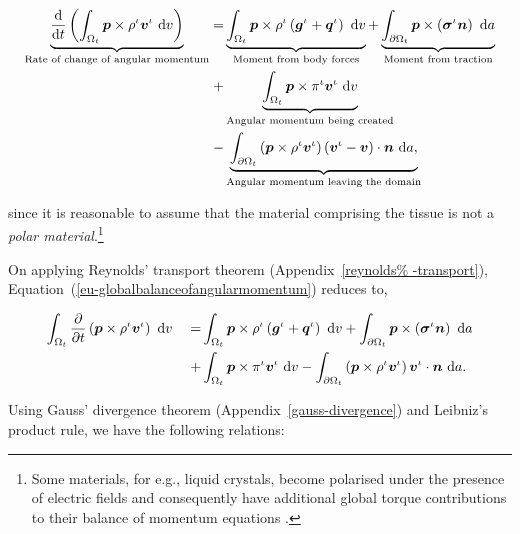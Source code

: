 \begin{equation}
\begin{split}
\underbrace{\frac{\mathrm{d}}{\mathrm{d}t}\left(\int_{\Omega_{t}} \mbox{\boldmath$ p$}
  \times \rho^{\iota} \mbox{\boldmath$ v$}^{\iota}\ \mathrm{d}v\right)}_{\text{Rate of
    change of angular momentum}} = & \underbrace{\int_{\Omega_{t}} \mbox{\boldmath$ p$}
  \times \rho^{\iota} \left(\mbox{\boldmath$ g$}^{\iota} +
  \mbox{\boldmath$ q$}^{\iota}\right)\ \mathrm{d}v}_{\text{Moment from body forces}} +
\underbrace{\int_{\partial \Omega_{t}} \mbox{\boldmath$ p$} \times
  \left(\mbox{\boldmath$\sigma$}^{\iota}\mbox{\boldmath$ n$}\right)\ \mathrm{d}a}_{\text{Moment from
    traction}}\\ + & \underbrace{\int_{\Omega_{t}} \mbox{\boldmath$ p$} \times
  \pi^{\iota}\mbox{\boldmath$ v$}^{\iota}\ \mathrm{d}v}_{\text{Angular momentum being
    created}} \\ - & \underbrace{\int_{\partial \Omega_{t}} \left(\mbox{\boldmath$ p$}
  \times \rho^{\iota} \mbox{\boldmath$ v$}^{\iota}\right) \left(\mbox{\boldmath$ v$}^{\iota} -
  \mbox{\boldmath$ v$}\right) \cdot \mbox{\boldmath$ n$}\ \mathrm{d}a,}_{\text{Angular momentum leaving
    the domain}}
\end{split}
\label{eu-globalbalanceofangularmomentum}
\end{equation}

\noindent since it is reasonable to assume that the material
comprising the tissue is not a {\em polar material}.\footnote{Some
  materials, for e.g., liquid crystals, become polarised under the
  presence of electric fields and consequently have additional global
  torque contributions to their balance of momentum equations
  \citep{TruesdellNoll:65}.} 

On applying Reynolds' transport theorem (Appendix~\ref{reynolds%
  -transport}), Equation~(\ref{eu-globalbalanceofangularmomentum})
reduces to,

\begin{equation*}
\begin{split}
\int_{\Omega_{t}} \frac{\partial}{\partial t}\left( \mbox{\boldmath$ p$} \times \rho^{\iota}
  \mbox{\boldmath$ v$}^{\iota}\right)\ \mathrm{d}v \quad =
& \int_{\Omega_{t}} \mbox{\boldmath$ p$} \times \rho^{\iota} \left(\mbox{\boldmath$ g$}^{\iota} +
  \mbox{\boldmath$ q$}^{\iota}\right)\ \mathrm{d}v
+ \int_{\partial \Omega_{t}}
  \mbox{\boldmath$ p$} \times \left(\mbox{\boldmath$\sigma$}^{\iota}\mbox{\boldmath$ n$}\right)\ \mathrm{d}a\\
+ & \int_{\Omega_{t}} \mbox{\boldmath$ p$} \times 
  \pi^{\iota}\mbox{\boldmath$ v$}^{\iota}\ \mathrm{d}v - \int_{\partial \Omega_{t}} \left(\mbox{\boldmath$ p$}
  \times \rho^{\iota} 
  \mbox{\boldmath$ v$}^{\iota}\right) \mbox{\boldmath$ v$}^{\iota} \cdot \mbox{\boldmath$ n$}\ \mathrm{d}a.
\end{split}
\end{equation*}

Using Gauss' divergence theorem (Appendix~\ref{gauss-divergence}) and
Leibniz's product rule, we have the following relations:

